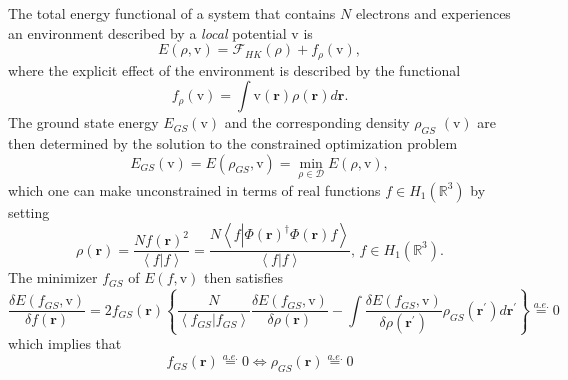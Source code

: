 \documentclass[aps,preprint]{revtex4}%
\begin{document}
The total energy functional of a system that contains $N$ electrons and
experiences an environment described by a \emph{local} potential $\mathrm{v}$
is
\begin{equation}
E\left(  \rho\boldsymbol{,}\mathrm{v}\right)  =\mathcal{F}_{HK}\left(
\rho\right)  +f_{\rho}\left(  \mathrm{v}\right)  ,
\end{equation}
where the explicit effect of the environment is described by the functional
\begin{equation}
f_{\rho}\left(  \mathrm{v}\right)  =\int\mathrm{v}\left(  \boldsymbol{r}%
\right)  \rho\left(  \boldsymbol{r}\right)  d\boldsymbol{r.}%
\end{equation}
The ground state energy $E_{GS}\left(  \mathrm{v}\right)  $ and the
corresponding density $\rho_{GS}$ $\left(  \mathrm{v}\right)  $ are then
determined by the solution to the constrained optimization problem
\begin{equation}
E_{GS}\left(  \mathrm{v}\right)  =E\left(  \rho_{GS}\boldsymbol{,}%
\mathrm{v}\right)  =\min_{\rho\in\mathcal{D}}E\left(  \rho\boldsymbol{,}%
\mathrm{v}\right)  , \label{GS}%
\end{equation}
which one can make unconstrained in terms of real functions $f\in H_{1}\left(
\mathbb{R}^{3}\right)  $ \cite{Lieb1983} by setting
\begin{equation}
\rho\left(  \boldsymbol{r}\right)  =\frac{Nf\left(  \boldsymbol{r}\right)
^{2}}{\left\langle f|f\right\rangle }=\frac{N\left\langle f\left\vert
\Phi\left(  \boldsymbol{r}\right)  ^{\dagger}\Phi\left(  \boldsymbol{r}%
\right)  f\right.  \right\rangle }{\left\langle f|f\right\rangle },\,f\in
H_{1}\left(  \mathbb{R}^{3}\right)  . \label{rho_f}%
\end{equation}
The minimizer $f_{GS}$ of $E\left(  f\boldsymbol{,}\mathrm{v}\right)  $ then
satisfies
\begin{equation}
\frac{\delta E\left(  f_{GS}\boldsymbol{,}\mathrm{v}\right)  }{\delta f\left(
\boldsymbol{r}\right)  }=2f_{GS}\left(  \boldsymbol{r}\right)  \left\{
\frac{N}{\left\langle f_{GS}|f_{GS}\right\rangle }\frac{\delta E\left(
f_{GS}\boldsymbol{,}\mathrm{v}\right)  }{\delta\rho\left(  \boldsymbol{r}%
\right)  }-\int\frac{\delta E\left(  f_{GS}\boldsymbol{,}\mathrm{v}\right)
}{\delta\rho\left(  \boldsymbol{r}^{\prime}\right)  }\rho_{GS}\left(
\boldsymbol{r}^{\prime}\right)  d\boldsymbol{r}^{\prime}\right\}
\overset{a.e.}{=}0
\end{equation}
which implies that
\begin{equation}
f_{GS}\left(  \boldsymbol{r}\right)  \overset{a.e.}{=}0\Leftrightarrow
\rho_{GS}\left(  \boldsymbol{r}\right)  \overset{a.e.}{=}0
\end{equation}
\end{document}
